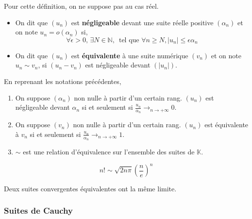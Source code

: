 	
	
	\begin{definition}
		Pour cette définition, on ne suppose pas au cas réel.
		\begin{itemize}
			\item On dit que $(u_n)$ est \textbf{négligeable} devant une suite réelle positive $(\alpha_n)$ et on note $u_n = o(\alpha_n)$ si,
			\[ \forall \epsilon > 0, \, \exists N \in \mathbb{N}, \, \text{ tel que } \forall n \geq N, \vert u_n \vert \leq \epsilon \alpha_n  \]
			\item On dit que $(u_n)$ est \textbf{équivalente} à une suite numérique $(v_n)$ et on note $u_n \sim v_n$, si $(u_n - v_n)$ est négligeable devant $(\vert u_n \vert)$.
		\end{itemize}
	\end{definition}
	
	\begin{proposition}
		En reprenant les notations précédentes,
		\begin{enumerate}[label=(\roman*)]
			\item On suppose $(\alpha_n)$ non nulle à partir d'un certain rang. $(u_n)$ est négligeable devant $\alpha_n$ si et seulement si $\frac{u_n}{\alpha_n} \longrightarrow_{n \rightarrow +\infty} 0$.
			\item On suppose $(v_n)$ non nulle à partir d'un certain rang. $(u_n)$ est équivalente à $v_n$ si et seulement si $\frac{u_n}{\alpha_n} \longrightarrow_{n \rightarrow +\infty} 1$.
			\item $\sim$ est une relation d'équivalence sur l'ensemble des suites de $\mathbb{K}$.
		\end{enumerate}
	\end{proposition}
	
	\reference{353}
	
	\begin{example}
		\[ n! \sim \sqrt{2n\pi} \left( \frac{n}{e} \right)^n \]
	\end{example}
	
	\reference{28}
	
	\begin{proposition}
		Deux suites convergentes équivalentes ont la même limite.
	\end{proposition}
	
	\subsubsection{Suites de Cauchy}
	
